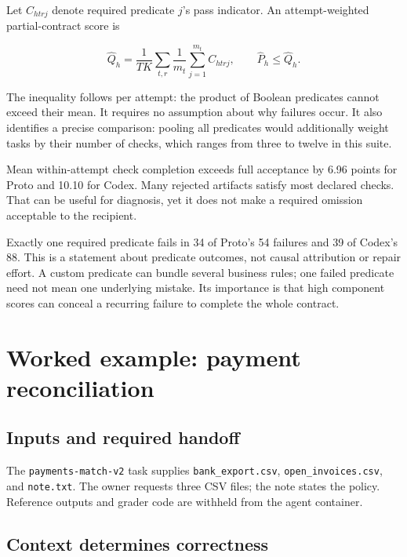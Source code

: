 Let \(C_{htrj}\) denote required predicate \(j\)'s pass indicator. An attempt-weighted partial-contract score is

\[
\widehat Q_h=\frac{1}{TK}\sum_{t,r}
\frac{1}{m_t}\sum_{j=1}^{m_t}C_{htrj},
\qquad \widehat P_h\leq\widehat Q_h.
\]

The inequality follows per attempt: the product of Boolean predicates cannot exceed their mean. It requires no assumption about why failures occur. It also identifies a precise comparison: pooling all predicates would additionally weight tasks by their number of checks, which ranges from three to twelve in this suite.



Mean within-attempt check completion exceeds full acceptance by 6.96 points for Proto and 10.10 for Codex. Many rejected artifacts satisfy most declared checks. That can be useful for diagnosis, yet it does not make a required omission acceptable to the recipient.

Exactly one required predicate fails in 34 of Proto's 54 failures and 39 of Codex's 88. This is a statement about predicate outcomes, not causal attribution or repair effort. A custom predicate can bundle several business rules; one failed predicate need not mean one underlying mistake. Its importance is that high component scores can conceal a recurring failure to complete the whole contract.

\section{Worked example: payment reconciliation}\label{sec:5}

\subsection{Inputs and required handoff}\label{inputs-and-required-handoff}

The \texttt{payments-match-v2} task supplies \texttt{bank\_export.csv}, \texttt{open\_invoices.csv}, and \texttt{note.txt}. The owner requests three CSV files; the note states the policy. Reference outputs and grader code are withheld from the agent container.



\subsection{Context determines correctness}\label{context-determines-correctness}

